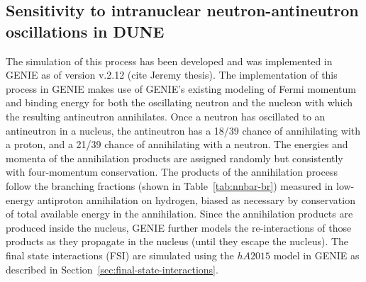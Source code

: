 
\subsection{Sensitivity to intranuclear neutron-antineutron oscillations in DUNE}
\label{subsec:nonaccel-nnbar-dunesensitivity}

The simulation of this process has been developed and was implemented in GENIE as of version v.2.12 (cite Jeremy thesis). The implementation of this process in GENIE makes use of GENIE's existing modeling of Fermi momentum and binding energy for both the oscillating neutron and the nucleon with which the resulting antineutron annihilates.   Once a neutron has oscillated to an antineutron in a nucleus, the antineutron has a 18/39 chance of annihilating with a proton, and a 21/39 chance of annihilating with a neutron. The energies and momenta of the annihilation products are assigned randomly but consistently with four-momentum conservation. The products of the annihilation process follow the branching fractions (shown in Table~\ref{tab:nnbar-br}) measured in low-energy antiproton annihilation on hydrogen, biased as necessary by conservation of total available energy in the annihilation. Since the annihilation products are produced inside the nucleus, GENIE further models the re-interactions of those products as they propagate in the nucleus (until they escape the nucleus).  The final state interactions (FSI) are simulated using the $hA2015$ model in GENIE as described in Section~\ref{sec:final-state-interactions}.

